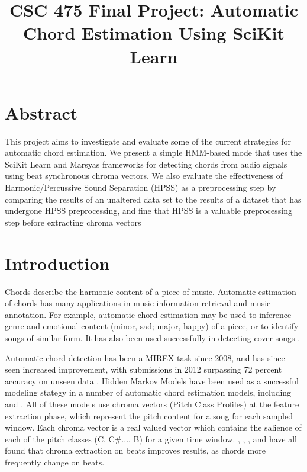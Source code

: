 \documentclass{article}
\title{CSC 475 Final Project: Automatic Chord Estimation Using SciKit Learn}
\begin{document}
%
\maketitle
%


\section{Abstract}\label{sec:desoutline}
This project aims to investigate and evaluate some of the current strategies
for automatic chord estimation. We present a simple HMM-based mode that uses
the SciKit Learn and Marsyas frameworks for detecting chords from audio signals 
using beat synchronous chroma vectors. We also evaluate the effectiveness of 
Harmonic/Percussive Sound Separation (HPSS) as a preprocessing step by comparing
the results of an unaltered data set to the results of a dataset that has undergone HPSS
preprocessing, and fine that HPSS is a valuable preprocessing step before extracting
chroma vectors

\section{Introduction}\label{sec:intro}

Chords describe the harmonic content of a piece of music. Automatic estimation of chords
has many applications in music information retrieval and music annotation. For example,
automatic chord estimation may be used to inference genre and emotional content 
(minor, sad; major, happy) of a piece, or to identify songs of similar form.
It has also been used successfully in detecting cover-songs \cite{Papadopoulos:18}.

Automatic chord detection has been a MIREX task since 2008, and has since seen increased
improvement, with submissions in 2012 surpassing 72 percent accuracy on unseen data
\cite{McVicar:00}. Hidden Markov Models have been used as a successful modeling stategy
 in a number of automatic chord estimation models, including \cite{Ueda:01} \cite{Lee:15} \cite{Ueda:19}
and \cite{Papadopoulos:18}. All of these models use chroma vectors (Pitch Class Profiles)
at the feature extraction phase, which represent the pitch content for a song for each sampled
window. Each chroma vector is a real valued vector which contains the salience of each of the 
pitch classes (C, C\#.... B) for a given time window. \cite{McVicar:00},  \cite{Lee:15}, \cite{Papadopoulos:18}, and\cite{Zenz:20} have all found that chroma extraction on beats improves results, as chords more frequently change on beats.
\end{document}
